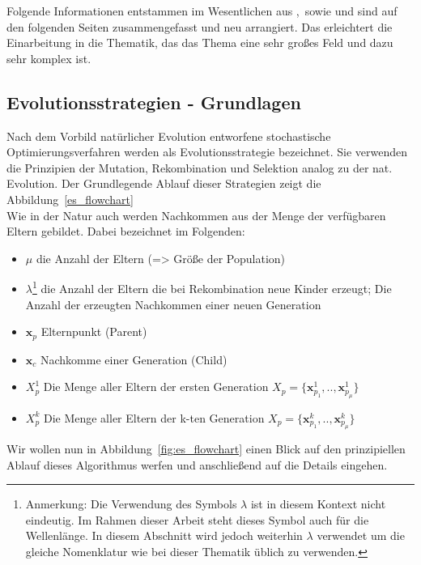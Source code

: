\label{seq:EvolutionaryStrategies}
Folgende Informationen entstammen im Wesentlichen aus \cite{kost2003optimierung},\cite{bronstejn2012taschenbuch}\ sowie \cite{Hansen:1} und sind auf den folgenden Seiten zusammengefasst und neu arrangiert. Das erleichtert die Einarbeitung in die Thematik, das das Thema eine sehr großes Feld und dazu sehr komplex ist.\\
\subsection{Evolutionsstrategien - Grundlagen }
%
Nach dem Vorbild natürlicher Evolution entworfene stochastische Optimierungsverfahren werden als Evolutionsstrategie bezeichnet. Sie verwenden die Prinzipien der Mutation, Rekombination und Selektion analog zu der nat. Evolution. Der Grundlegende Ablauf dieser Strategien zeigt die Abbildung~\ref{es_flowchart}\\
Wie in der Natur auch werden Nachkommen aus der Menge der verfügbaren Eltern gebildet. Dabei bezeichnet im Folgenden:
%
\begin{itemize}
	\item $\mu$ die Anzahl der Eltern (=> Größe der Population)
	\item $\lambda$\footnote{Anmerkung: Die Verwendung des Symbols $\lambda$ ist in diesem Kontext nicht eindeutig. Im Rahmen dieser Arbeit steht dieses Symbol auch für die Wellenlänge. In diesem Abschnitt wird jedoch weiterhin $\lambda$ verwendet um die gleiche Nomenklatur wie bei dieser Thematik üblich zu verwenden.} die Anzahl der Eltern die bei Rekombination neue Kinder erzeugt; Die Anzahl der erzeugten Nachkommen einer neuen Generation
	\item $\mathbf{x}_p$ Elternpunkt (Parent)
	\item $\mathbf{x}_c$ Nachkomme einer Generation (Child)
	\item $X_p^1$ Die Menge aller Eltern der ersten Generation $X_p = \{\mathbf{x}_{p_1}^1,..,\mathbf{x}_{p_\mu}^1\}$
	\item $X_p^k$ Die Menge aller Eltern der k-ten Generation $X_p = \{\mathbf{x}_{p_1}^k,..,\mathbf{x}_{p_\mu}^k\}$
\end{itemize}
%
Wir wollen nun in Abbildung~\ref{fig:es_flowchart} einen Blick auf den prinzipiellen Ablauf dieses Algorithmus werfen und anschließend auf die Details eingehen.
%

%

